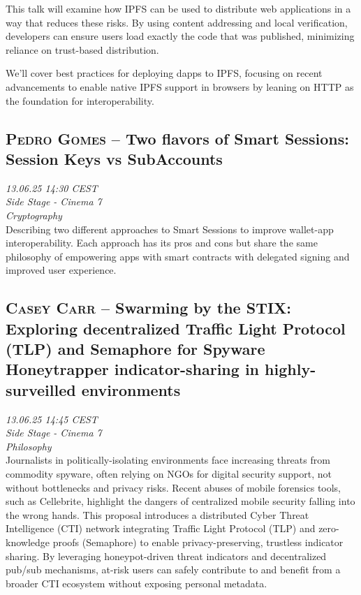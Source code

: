 This talk will examine how IPFS can be used to distribute web applications in a way that reduces these risks. By using content addressing and local verification, developers can ensure users load exactly the code that was published, minimizing reliance on trust-based distribution.

We’ll cover best practices for deploying dapps to IPFS, focusing on recent advancements to enable native IPFS support in browsers by leaning on HTTP as the foundation for interoperability.

\clearpage
\subsection {\textsc{Pedro Gomes}  -- Two flavors of Smart Sessions: Session Keys vs SubAccounts} \noindent \textit {13.06.25 14:30 CEST\\ Side Stage - Cinema 7\\ Cryptography}\\[1em] Describing two different approaches to Smart Sessions to improve wallet-app interoperability. Each approach has its pros and cons but share the same philosophy of empowering apps with smart contracts with delegated signing and improved user experience.

\clearpage
\subsection {\textsc{Casey Carr}  -- Swarming by the STIX: Exploring decentralized Traffic Light Protocol (TLP) and Semaphore for Spyware Honeytrapper indicator-sharing in highly-surveilled environments} \noindent \textit {13.06.25 14:45 CEST\\ Side Stage - Cinema 7\\ Philosophy}\\[1em] Journalists in politically-isolating environments face increasing threats from commodity spyware, often relying on NGOs for digital security support, not without bottlenecks and privacy risks. Recent abuses of mobile forensics tools, such as Cellebrite, highlight the dangers of centralized mobile security falling into the wrong hands. This proposal introduces a distributed Cyber Threat Intelligence (CTI) network integrating Traffic Light Protocol (TLP) and zero-knowledge proofs (Semaphore) to enable privacy-preserving, trustless indicator sharing. By leveraging honeypot-driven threat indicators and decentralized pub/sub mechanisms, at-risk users can safely contribute to and benefit from a broader CTI ecosystem without exposing personal metadata.


